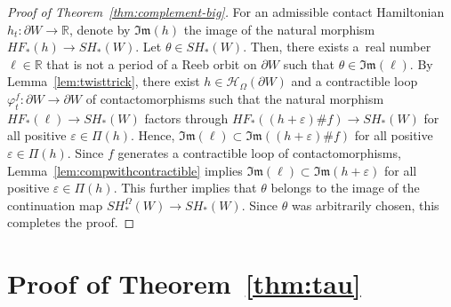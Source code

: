 \documentclass[10pt,a4paper]{amsart}
\numberwithin{equation}{section}
\theoremstyle{definition}
\begin{document}
\begin{proof}[Proof of Theorem~\ref{thm:complement-big}]
For an admissible contact Hamiltonian $h_t\colon \partial W\to\mathbb{R}$, denote by $\mathfrak{Im}(h)$ the image of the natural morphism $HF_\ast(h)\to SH_\ast(W)$. Let $\theta\in SH_\ast(W)$. Then, there exists a~real number $\ell\in \mathbb{R}$ that is not a period of a Reeb orbit on $\partial W$ such that $\theta\in\mathfrak{Im}(\ell)$. By Lemma~\ref{lem:twisttrick}, there exist $h\in\mathcal{H}_\Omega(\partial W)$ and a contractible loop $\varphi^f_t\colon \partial W\to\partial W$ of contactomorphisms such that the natural morphism $HF_\ast(\ell)\to SH_\ast(W)$ factors through $HF_\ast((h+\varepsilon)\#f)\to SH_\ast(W)$ for all positive $\varepsilon \in \Pi(h)$. Hence, $\mathfrak{Im}(\ell)\subset \mathfrak{Im}((h+\varepsilon)\# f)$ for all positive $\varepsilon \in \Pi(h)$. Since $f$ generates a contractible loop of contactomorphisms, Lemma~\ref{lem:compwithcontractible} implies $\mathfrak{Im}(\ell)\subset \mathfrak{Im}(h+\varepsilon)$ for all positive $\varepsilon \in \Pi(h)$. This further implies that $\theta$ belongs to the image of the continuation map $SH_\ast^\Omega(W)\to SH_\ast(W)$. Since $\theta$ was arbitrarily chosen, this completes the proof.
\end{proof}



\section{Proof of Theorem~\ref{thm:tau}}\label{sec:tau}
\end{document}
